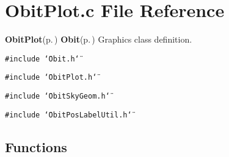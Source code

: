\section{Obit\-Plot.c File Reference}
\label{ObitPlot_8c}
{\bf Obit\-Plot}{\rm (p.\,\pageref{structObitPlot})} {\bf Obit}{\rm (p.\,\pageref{structObit})} Graphics class definition. 

{\tt \#include \char`\"{}Obit.h\char`\"{}}\par
{\tt \#include \char`\"{}Obit\-Plot.h\char`\"{}}\par
{\tt \#include \char`\"{}Obit\-Sky\-Geom.h\char`\"{}}\par
{\tt \#include \char`\"{}Obit\-Pos\-Label\-Util.h\char`\"{}}\par
\subsection*{Functions}
